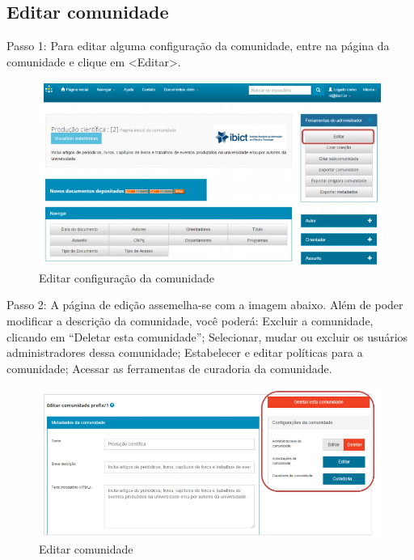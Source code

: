 \documentclass[12pt,hidelinks]{article}
\begin{document}
    \subsection{Editar comunidade}
    
    Passo 1: Para editar alguma configuração da comunidade, entre na página da comunidade e clique em <Editar>.
    
    \begin{figure}[!htp]
                \centering
                \includegraphics[scale=0.8]{figura/Figura17.png}
                \caption{Editar configuração da comunidade}
            \label{Rotulo}
        \end{figure}
        
    Passo 2: A página de edição assemelha-se com a imagem abaixo. Além de poder modificar a descrição da comunidade, você poderá:
    \singlespacing
    Excluir a comunidade, clicando em “Deletar esta comunidade”;
    Selecionar, mudar ou excluir os usuários administradores dessa comunidade;
    Estabelecer e editar políticas para a comunidade;
    Acessar as ferramentas de curadoria da comunidade.
    
    \begin{figure}[!htp]
                \centering
                \includegraphics[scale=0.7]{figura/Figura18.png}
                \caption{Editar comunidade}
            \label{Rotulo}
        \end{figure}
        
\end{document}
